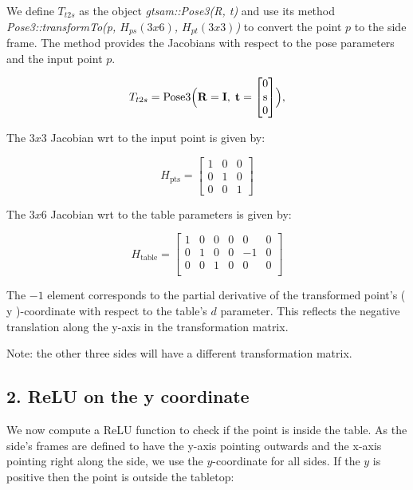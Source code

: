\documentclass[11pt]{article}
\begin{document}
    We define $T_{t2s}$ as the object \textit{gtsam::Pose3(R, t)} and use its method \textit{Pose3::transformTo(p, $H_{ps}(3x6)$, $H_{pt}(3x3)$)} to convert the point \(p\) to the side frame.
    The method provides the Jacobians with respect to the pose parameters and the input point \(p\).

    \begin{equation}
        T_{t2s} = \text{Pose3}\Bigl(\mathbf{R}=\mathbf{I},\; \mathbf{t} = \begin{bmatrix} 0 \\ \text{s} \\ 0 \end{bmatrix}\Bigr),
    \end{equation}

    The $3x3$ Jacobian wrt to the input point is given by:

    \begin{equation}
        H_{\text{pts}} = \begin{bmatrix} 1 & 0 & 0 \\ 0 & 1 & 0 \\ 0 & 0 & 1  \end{bmatrix}
    \end{equation}

    The $3x6$ Jacobian wrt to the table parameters is given by:

    \begin{equation}
        H_{\text{table}} = \begin{bmatrix} 1 & 0 & 0 & 0 & 0 & 0 \\ 0 & 1 & 0 & 0 & -1 & 0 \\ 0 & 0 & 1 & 0 & 0 & 0 \\ \end{bmatrix}
    \end{equation}

    The $-1$ element corresponds to the partial derivative of the transformed point's ( y )-coordinate with respect to the table's $d$ parameter. This reflects the negative translation along the y-axis in the transformation matrix.

    Note: the other three sides will have a different transformation matrix.

    \subsection*{2. ReLU on the y coordinate}

    We now compute a ReLU function to check if the point is inside the table.
    As the side's frames are defined to have the y-axis pointing outwards and the x-axis pointing right along the side, we use the \(y\)-coordinate for all sides.
    If the $y$ is positive then the point is outside the tabletop:
\end{document}
